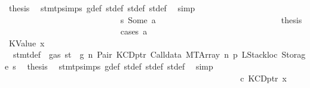 \begin{isabellebody}
\ {\isacharquery}{\kern0pt}thesis\ \isamarkupfalse%
\ stmt{\isachardot}{\kern0pt}psimps{\isacharparenleft}{\kern0pt}{}{\isacharparenright}{\kern0pt}\ g{\isacharunderscore}{\kern0pt}def\ st{\isacharprime}{\kern0pt}{\isacharunderscore}{\kern0pt}def\ st{\isacharprime}{\kern0pt}{\isacharprime}{\kern0pt}{\isacharunderscore}{\kern0pt}def\ st{\isacharprime}{\kern0pt}{\isacharprime}{\kern0pt}{\isacharprime}{\kern0pt}{\isacharunderscore}{\kern0pt}def\ \isamarkupfalse%
\ simp\isanewline
\ \ \ \ \ \ \ \ \ \ \ \ \ \ \ \ \ \ \ \ \ \ \ \ \isamarkupfalse%
\isanewline
\ \ \ \ \ \ \ \ \ \ \ \ \ \ \ \ \ \ \ \ \ \ \ \ \ \ \isamarkupfalse%
\ s{}{\isacharcolon}{\kern0pt}\ {\isacharparenleft}{\kern0pt}Some\ a{\isacharparenright}{\kern0pt}\isanewline
\ \ \ \ \ \ \ \ \ \ \ \ \ \ \ \ \ \ \ \ \ \ \ \ \ \ \isamarkupfalse%
\ \isamarkupfalse%
\ {\isacharquery}{\kern0pt}thesis\isanewline
\ \ \ \ \ \ \ \ \ \ \ \ \ \ \ \ \ \ \ \ \ \ \ \ \ \ \isamarkupfalse%
\ {\isacharparenleft}{\kern0pt}cases\ a{\isacharparenright}{\kern0pt}\isanewline
\ \ \ \ \ \ \ \ \ \ \ \ \ \ \ \ \ \ \ \ \ \ \ \ \ \ \ \ \isamarkupfalse%
\ {\isacharparenleft}{\kern0pt}KValue\ x{}{\isacharparenright}{\kern0pt}\isanewline
\ \ \ \ \ \ \ \ \ \ \ \ \ \ \ \ \ \ \ \ \ \ \ \ \ \ \ \ \isamarkupfalse%
\ {}{\isacharparenleft}{\kern0pt}{}{\isacharparenright}{\kern0pt}\ stmt{\isacharunderscore}{\kern0pt}def\ {\isacharbackquoteopen}{\isasymnot}\ gas\ st\ {\isasymle}\ g{\isacharbackquoteclose}\ n\ Pair\ KCDptr\ Calldata\ MTArray\ n{}\ p{}\ LStackloc\ Storage\ s{}\ \isamarkupfalse%
\ {\isacharquery}{\kern0pt}thesis\ \isamarkupfalse%
\ stmt{\isachardot}{\kern0pt}psimps{\isacharparenleft}{\kern0pt}{}{\isacharparenright}{\kern0pt}\ g{\isacharunderscore}{\kern0pt}def\ st{\isacharprime}{\kern0pt}{\isacharunderscore}{\kern0pt}def\ st{\isacharprime}{\kern0pt}{\isacharprime}{\kern0pt}{\isacharunderscore}{\kern0pt}def\ st{\isacharprime}{\kern0pt}{\isacharprime}{\kern0pt}{\isacharprime}{\kern0pt}{\isacharunderscore}{\kern0pt}def\ \isamarkupfalse%
\ simp\isanewline
\ \ \ \ \ \ \ \ \ \ \ \ \ \ \ \ \ \ \ \ \ \ \ \ \ \ \isamarkupfalse%
\isanewline
\ \ \ \ \ \ \ \ \ \ \ \ \ \ \ \ \ \ \ \ \ \ \ \ \ \ \ \ \isamarkupfalse%
\ c{}{\isacharcolon}{\kern0pt}\ {\isacharparenleft}{\kern0pt}KCDptr\ x{}{\isacharparenright}{\kern0pt}\isanewline

\end{isabellebody}
